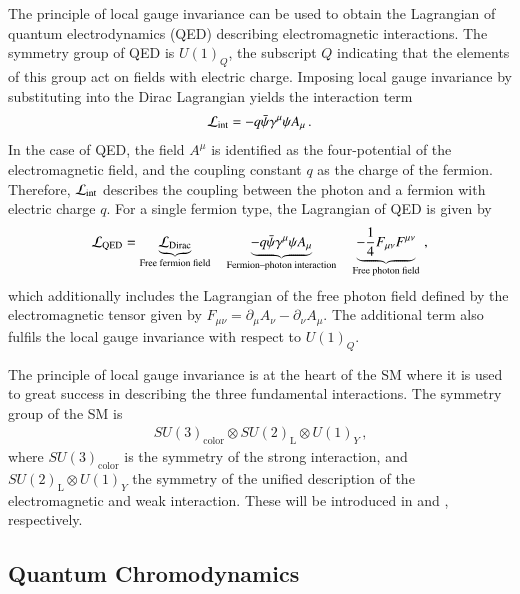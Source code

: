 The principle of local gauge invariance can be used to obtain the Lagrangian of
quantum electrodynamics (QED) describing electromagnetic interactions. The
symmetry group of QED is $U(1)_{Q}$, the subscript $Q$ indicating that the
elements of this group act on fields with electric charge. Imposing local gauge
invariance by substituting  into the Dirac
Lagrangian yields the interaction term
\begin{align*}
  \mathcal{L}_{\text{int}} = - q \bar{\psi} \gamma^\mu \psi A_\mu \,\text{.}
\end{align*}
In the case of QED, the field $A^\mu$ is identified as the four-potential of the
electromagnetic field, and the coupling constant $q$ as the charge of the
fermion. Therefore, $\mathcal{L}_{\text{int}}$ describes the coupling between the
photon and a fermion with electric charge $q$. For a single fermion type, the
Lagrangian of QED is given by
\begin{align*}
  \mathcal{L}_{\text{QED}} = \underbrace{\mathcal{L}_{\text{Dirac}}}_{\text{Free fermion field}}
  \quad\underbrace{- q \bar{\psi} \gamma^\mu \psi A_\mu}_{\text{Fermion--photon interaction}}
  \quad\underbrace{- \frac{1}{4} F_{\mu\nu} F^{\mu\nu}}_{\text{Free photon field}} \,\text{,}
\end{align*}
which additionally includes the Lagrangian of the free photon field defined by
the electromagnetic tensor given by
$F_{\mu\nu} = \partial_\mu A_\nu - \partial_\nu A_\mu$. The additional term also
fulfils the local gauge invariance with respect to $U(1)_Q$.

The principle of local gauge invariance is at the heart of the SM where it is
used to great success in describing the three fundamental interactions. The
symmetry group of the SM is
\begin{align*}
  SU(3)_{\text{color}} \otimes SU(2)_{\text{L}} \otimes U(1)_Y \,\text{,}
\end{align*}
where $SU(3)_{\text{color}}$ is the symmetry of the strong interaction, and
$SU(2)_{\text{L}} \otimes U(1)_Y$ the symmetry of the unified description of the
electromagnetic and weak interaction. These will be introduced in
 and , respectively.




\subsection{Quantum Chromodynamics}%
\label{sec:theory_qcd}

